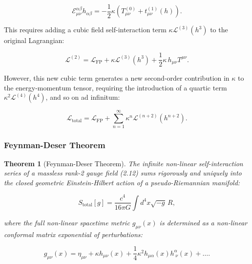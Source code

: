 \documentclass[11pt,a4paper]{article}
\newtheorem{theorem}{Theorem}[section]
\theoremstyle{definition}
\begin{document}
\begin{equation}\label{eq:2.10}\tag{2.10}
\mathcal{E}_{\mu\nu}^{\alpha\beta} h_{\alpha\beta} = -\frac{1}{2}\kappa \left( T_{\mu\nu}^{(0)} + t_{\mu\nu}^{(1)}(h) \right).
\end{equation}

This requires adding a cubic field self-interaction term $\kappa \mathcal{L}^{(3)}(h^3)$ to the original Lagrangian:

\begin{equation}\label{eq:2.11}\tag{2.11}
\mathcal{L}^{(2)} = \mathcal{L}_{\text{FP}} + \kappa \mathcal{L}^{(3)}(h^3) + \frac{1}{2}\kappa \, h_{\mu\nu} T^{\mu\nu}.
\end{equation}

However, this new cubic term generates a new second-order contribution in $\kappa$ to the energy-momentum tensor, requiring the introduction of a quartic term $\kappa^2 \mathcal{L}^{(4)}(h^4)$, and so on ad infinitum:

\begin{equation}\label{eq:2.12}\tag{2.12}
\mathcal{L}_{\text{total}} = \mathcal{L}_{\text{FP}} + \sum_{n=1}^\infty \kappa^n \mathcal{L}^{(n+2)}(h^{n+2}).
\end{equation}

\subsubsection{Feynman-Deser Theorem}\label{sec:feynman-deser-thm}

\begin{theorem}[Feynman-Deser Theorem]\label{thm:feynman-deser}
The infinite non-linear self-interaction series of a massless rank-2 gauge field (2.12) sums rigorously and uniquely into the closed geometric Einstein-Hilbert action of a pseudo-Riemannian manifold:

\begin{equation}\label{eq:2.13}\tag{2.13}
S_{\text{total}}[g] = \frac{c^4}{16\pi G} \int d^4x \sqrt{-g} \, R,
\end{equation}

where the full non-linear spacetime metric $g_{\mu\nu}(x)$ is determined as a non-linear conformal matrix exponential of perturbations:

\begin{equation}\label{eq:2.14}\tag{2.14}
g_{\mu\nu}(x) = \eta_{\mu\nu} + \kappa h_{\mu\nu}(x) + \frac{1}{4}\kappa^2 h_{\mu\alpha}(x) h^\alpha_{\;\nu}(x) + \dots.
\end{equation}
\end{theorem}
\end{document}
